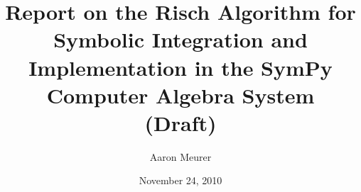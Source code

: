 \documentclass[12pt]{report}
\begin{document}
\title{Report on the Risch Algorithm for Symbolic
Integration and Implementation in the Sym\-Py Computer Algebra System \\(Draft)}
\author{Aaron Meurer}
\date{November 24, 2010}
\maketitle
\tableofcontents
\listoffigures
\listoftables


\nocite{*}


\end{document}
